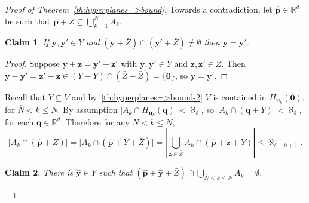 \documentclass[12pt]{amsart}
\newcommand{\R}{\mathbb{R}}	%
\newcommand{\set}[1]{\mathopen \{ {#1} \mathclose \}} %
\newcommand{\card}[1]{\mathopen | #1 \mathclose |}		%
\newcommand{\cardLR}[1]{ \left | #1 \right |}		%
\theoremstyle{plain}
\newtheorem{claim}{Claim}[theorem]
\theoremstyle{definition}
\theoremstyle{remark}
\begin{document}
\begin{proof}[Proof of Theorem~\ref{th:hyperplanes=>bound}]
Towards a contradiction, let \( \hat{\mathbf{p}} \in \R^d \) be such that \( \hat{\mathbf{p}} + Z \subseteq \bigcup_{ k = 1 }^N A_k \).

\begin{claim}\label{cl:th:hyperplanes=>bound-1}
If \( \mathbf{y} , \mathbf{y}' \in Y \) and \( ( \mathbf{y} + \bar{Z} ) \cap ( \mathbf{y}' + \bar{Z} ) \neq \emptyset \) then \( \mathbf{y} = \mathbf{y}' \).
\end{claim}

\begin{proof}
Suppose \( \mathbf{y} + \mathbf{z} = \mathbf{y}' + \mathbf{z}' \) with \( \mathbf{y} , \mathbf{y}' \in Y \) and \( \mathbf{z} , \mathbf{z}' \in \bar{Z} \).
Then \( \mathbf{y} - \mathbf{y} ' = \mathbf{z}' - \mathbf{z} \in ( Y - Y ) \cap ( \bar{Z} - \bar{Z} ) = \set{ \mathbf{0} } \), so \( \mathbf{y} = \mathbf{y}' \).
\end{proof}

Recall that \( Y \subseteq V \) and by~\eqref{th:hyperplanes=>bound-2} \( V \) is contained in \( H_{\mathbf{u}_k } ( \mathbf{0} ) \), for \( \bar{N} < k \leq N \).
By assumption \( \card{ A_k \cap H_{\mathbf{u}_k } ( \mathbf{q} ) } < \aleph_ { \delta } \), so \( \card{ A_k \cap ( \mathbf{q} + Y ) } < \aleph_ { \delta } \), for each \( \mathbf{q} \in \R^d \).
Therefore for any \( \bar{N} < k \leq N \),
\begin{equation}\label{th:hyperplanes=>bound-3}
\card{ A_k \cap ( \hat{\mathbf{p}} + Z ) } = \card{ A_k \cap ( \hat{\mathbf{p}} + Y + \bar{Z} ) } = \cardLR{ \textstyle \bigcup_{ \mathbf{z} \in \bar{Z} } A_k \cap ( \hat{\mathbf{p}} + \mathbf{z} + Y ) } \leq \aleph _{ \delta + \bar{n} + 1 } . 
\end{equation}

\begin{claim}\label{cl:th:hyperplanes=>bound-2}
There is \( \hat{\mathbf{y}} \in Y \) such that \( ( \hat{\mathbf{p}} + \hat{\mathbf{y}} + \bar{Z} ) \cap \bigcup_{ \bar{N} < k \leq N} A_k = \emptyset \).
\end{claim}


\end{proof}
\end{document}
